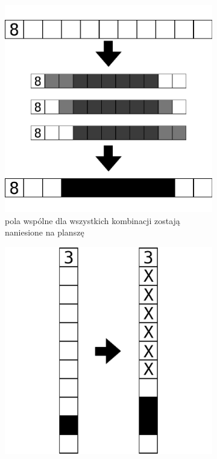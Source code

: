 \begin{figure}[!htb]
    \centering
    \begin{subfigure}[b]{0.35\textwidth}
        \centering
        \includegraphics[width=\textwidth]{images/elimination_solver_example_a.png}
        \caption{pola wspólne dla wszystkich kombinacji zostają naniesione na planszę}
    \end{subfigure}
    \hspace{0.1\textwidth}
    \begin{subfigure}[b]{0.35\textwidth}
        \centering
        \includegraphics[width=\textwidth]{images/elimination_solver_example_b.png}

\end{subfigure}
\end{figure}
